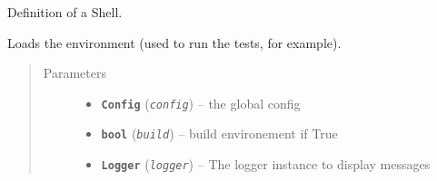 \documentclass[a4paper,10pt,english]{sphinxmanual}
\begin{document}

\begin{fulllineitems}
\label{commands/apidoc/src:src.environment.Shell}
Definition of a Shell.

\end{fulllineitems}


\begin{fulllineitems}
\label{commands/apidoc/src:src.environment.load_environment}
Loads the environment (used to run the tests, for example).
\begin{quote}\begin{description}
\item[{Parameters}] \leavevmode\begin{itemize}
\item {} 
\textbf{\texttt{Config}} (\emph{\texttt{config}}) -- the global config

\item {} 
\textbf{\texttt{bool}} (\emph{\texttt{build}}) -- build environement if True

\item {} 
\textbf{\texttt{Logger}} (\emph{\texttt{logger}}) -- The logger instance to display messages

\end{itemize}

\end{description}\end{quote}

\end{fulllineitems}
\end{document}
